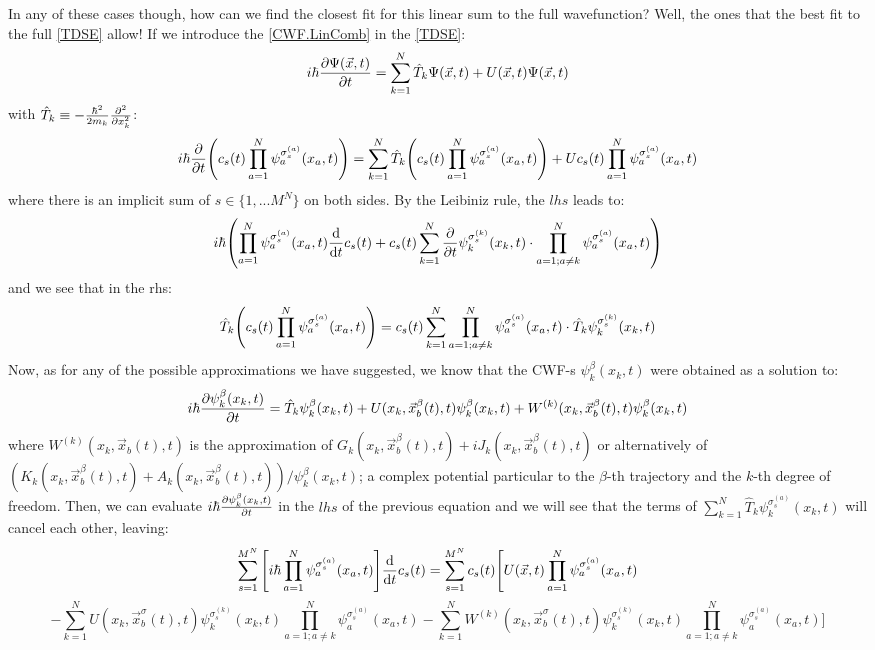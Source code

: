 \documentclass[11pt, a4paper]{article} %
\begin{document}
In any of these cases though, how can we find the closest fit for this linear sum to the full wavefunction? Well, the ones that the best fit to the full \ref{TDSE} allow! If we introduce the \ref{CWF.LinComb} in the \ref{TDSE}:
$$
i\hbar \pdv{\Psi(\vec{x},t)}{t} = \sum_{k=1}^N \hat{T}_k\Psi(\vec{x},t)+U(\vec{x},t)\Psi(\vec{x},t)
$$
with $\hat{T}_k\equiv -\frac{\hbar^2}{2m_k}\pdv[2]{}{x_k}$:
$$
i\hbar \pdv{}{t} \qty(c_s(t)\prod_{a=1}^N \psi_a^{\sigma_s^{(a)}}(x_a,t)) =  \sum_{k=1}^N \hat{T}_k\qty(c_s(t)\prod_{a=1}^N \psi_a^{\sigma_s^{(a)}}(x_a,t))+Uc_s(t)\prod_{a=1}^N \psi_a^{\sigma_s^{(a)}}(x_a,t)
$$
where there is an implicit sum of $s\in \{1,...M^N\}$ on both sides. By the Leibiniz rule, the $lhs$ leads to:
$$
i\hbar \qty(\prod_{a=1}^N \psi_a^{\sigma_s^{(a)}}(x_a,t)\dv{}{t}c_s(t)+c_s(t)\sum_{k=1}^N \pdv{}{t}\psi_k^{\sigma_s^{(k)}}(x_k,t)\cdot \prod_{a=1;a\neq k}^N \psi_a^{\sigma_s^{(a)}}(x_a,t) )
$$
and we see that in the rhs:
$$
\hat{T}_k\qty(c_s(t)\prod_{a=1}^N \psi_a^{\sigma_s^{(a)}}(x_a,t)) = c_s(t)\sum_{k=1}^N \prod_{a=1;a\neq k}^N  \psi_a^{\sigma_s^{(a)}}(x_a,t)  \cdot \hat{T}_k \psi_k^{\sigma_s^{(k)}}(x_k,t) 
$$
Now, as for any of the possible approximations we have suggested, we know that the CWF-s $\psi^\beta_k(x_k,t)$ were obtained as a solution to:
$$
i\hbar \pdv{\psi^\beta_k(x_k,t)}{t} = \hat{T}_k\psi^\beta_k(x_k,t) + U(x_k, \vec{x}^\beta_b(t), t)\psi^\beta_k(x_k,t) + W^{(k)}(x_k, \vec{x}^\beta_{b}(t),t) \psi^\beta_k(x_k,t)
$$
where $ W^{(k)}(x_k, \vec{x}_{b}(t),t)$ is the approximation of $G_k(x_k,\vec{x}^\beta_b(t),t)+iJ_k(x_k,\vec{x}^\beta_b(t),t)$ or alternatively of $(K_k(x_k,\vec{x}^\beta_b(t),t)+A_k(x_k,\vec{x}^\beta_b(t),t))/\psi^\beta_k(x_k,t)$; a complex potential particular to the $\beta$-th trajectory and the $k$-th degree of freedom. Then, we can evaluate $i\hbar \pdv{\psi^\beta_k(x_k,t)}{t}$ in the $lhs$ of the previous equation and we will see that the terms of $\sum_{k=1}^N \hat{T}_k \psi^{\sigma_s^{(a)}}_k(x_k,t)$ will cancel each other, leaving:
$$
\sum_{s=1}^{M^N} \qty[i\hbar \prod_{a=1}^N  \psi_a^{\sigma_s^{(a)}}(x_a,t)] \dv{}{t}c_s(t) = \sum_{s=1}^{M^N}c_s(t) \Bigg[ U(\vec{x},t)\prod_{a=1}^N  \psi_a^{\sigma_s^{(a)}}(x_a,t) 
$$
$$
- \sum_{k=1}^N U(x_k,\vec{x}_b^{\sigma}(t),t)\psi_k^{\sigma_s^{(k)}}(x_k,t) \prod_{a=1; a\neq k}^N  \psi_a^{\sigma_s^{(a)}}(x_a,t) -\sum_{k=1}^N W^{(k)}(x_k,\vec{x}_b^{\sigma}(t),t)\psi_k^{\sigma_s^{(k)}}(x_k,t) \prod_{a=1; a\neq k}^N  \psi_a^{\sigma_s^{(a)}}(x_a,t)\Bigg]
$$
\end{document}
